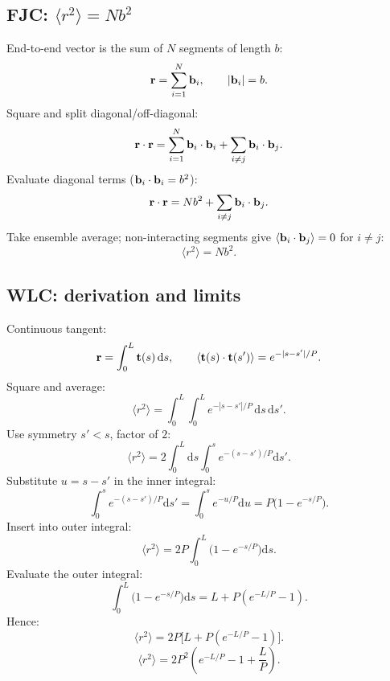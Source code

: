 \documentclass[11pt]{article}
\newcommand{\de}{\mathrm{d}}
\begin{document}
\subsection*{FJC: $\langle r^{2}\rangle=Nb^{2}$}

\begin{center}
\end{center}

End-to-end vector is the sum of $N$ segments of length $b$:
\[ \vb r=\sum_{i=1}^{N}\vb b_i,\qquad |\vb b_i|=b. \]
Square and split diagonal/off-diagonal:
\[ \vb r\cdot\vb r=\sum_{i=1}^{N}\vb b_i\cdot\vb b_i+\sum_{i\ne j}\vb b_i\cdot\vb b_j. \]
Evaluate diagonal terms ($\vb b_i\cdot\vb b_i=b^{2}$):
\[ \vb r\cdot\vb r=Nb^{2}+\sum_{i\ne j}\vb b_i\cdot\vb b_j. \]
Take ensemble average; non-interacting segments give $\langle\vb b_i\cdot\vb b_j\rangle=0$ for $i\ne j$:
\[ \boxed{\;\langle r^{2}\rangle=Nb^{2}.\;} \]

\subsection*{WLC: derivation and limits}

Continuous tangent:
\[ \vb r=\int_{0}^{L}\vb t(s)\,\de s,\qquad \langle\vb t(s)\cdot\vb t(s')\rangle=e^{-|s-s'|/P}. \]
Square and average:
\[ \langle r^{2}\rangle=\int_{0}^{L}\!\!\int_{0}^{L} e^{-|s-s'|/P}\,\de s\,\de s'. \]
Use symmetry $s'<s$, factor of $2$:
\[ \langle r^{2}\rangle=2\int_{0}^{L}\de s\int_{0}^{s}e^{-(s-s')/P}\de s'. \]
Substitute $u=s-s'$ in the inner integral:
\[ \int_{0}^{s}e^{-(s-s')/P}\de s'=\int_{0}^{s}e^{-u/P}\de u=P\bigl(1-e^{-s/P}\bigr). \]
Insert into outer integral:
\[ \langle r^{2}\rangle=2P\int_{0}^{L}\bigl(1-e^{-s/P}\bigr)\de s. \]
Evaluate the outer integral:
\[ \int_{0}^{L}\bigl(1-e^{-s/P}\bigr)\de s=L+P(e^{-L/P}-1). \]
Hence:
\[ \langle r^{2}\rangle=2P\bigl[L+P(e^{-L/P}-1)\bigr]. \]
\[ \boxed{\;\langle r^{2}\rangle=2P^{2}\!\left(e^{-L/P}-1+\frac{L}{P}\right).\;} \]
\end{document}
